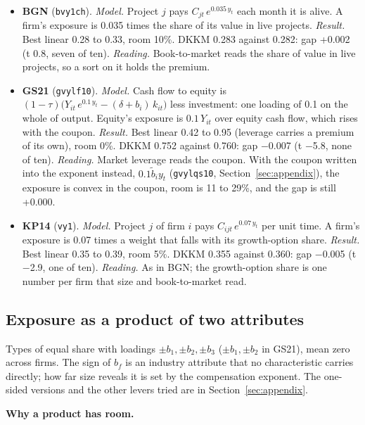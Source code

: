 \documentclass[11pt]{article}
\begin{document}
\begin{itemize}
\item \textbf{BGN} (\texttt{bvy1ch}). \emph{Model.} Project $j$ pays $C_{jt}\,e^{0.035\,y_t}$ each month it is alive. A firm's exposure is 0.035 times the share of its value in live projects. \emph{Result.} Best linear 0.28 to 0.33, room 10\%. DKKM 0.283 against 0.282: gap +0.002 (t 0.8, seven of ten). \emph{Reading.} Book-to-market reads the share of value in live projects, so a sort on it holds the premium.
\item \textbf{GS21} (\texttt{gvylf10}). \emph{Model.} Cash flow to equity is $(1-\tau)\big(Y_{it}\,e^{0.1\,y_t} - (\delta + b_i)\,k_{it}\big)$ less investment: one loading of 0.1 on the whole of output. Equity's exposure is $0.1\,Y_{it}$ over equity cash flow, which rises with the coupon. \emph{Result.} Best linear 0.42 to 0.95 (leverage carries a premium of its own), room 0\%. DKKM 0.752 against 0.760: gap $-$0.007 (t $-$5.8, none of ten). \emph{Reading.} Market leverage reads the coupon. With the coupon written into the exponent instead, $0.1 \tilde b_i y_t$ (\texttt{gvylqs10}, Section~\ref{sec:appendix}), the exposure is convex in the coupon, room is 11 to 29\%, and the gap is still +0.000.
\item \textbf{KP14} (\texttt{vy1}). \emph{Model.} Project $j$ of firm $i$ pays $C_{ijt}\,e^{0.07\,y_t}$ per unit time. A firm's exposure is 0.07 times a weight that falls with its growth-option share. \emph{Result.} Best linear 0.35 to 0.39, room 5\%. DKKM 0.355 against 0.360: gap $-$0.005 (t $-$2.9, one of ten). \emph{Reading.} As in BGN; the growth-option share is one number per firm that size and book-to-market read.
\end{itemize}
\subsection{Exposure as a product of two attributes}

Types of equal share with loadings $\pm b_1, \pm b_2, \pm b_3$ ($\pm b_1, \pm b_2$ in GS21), mean zero across firms. The sign of $b_f$ is an industry attribute that no characteristic carries directly; how far size reveals it is set by the compensation exponent. The one-sided versions and the other levers tried are in Section~\ref{sec:appendix}.



\textbf{Why a product has room.}
\end{document}
